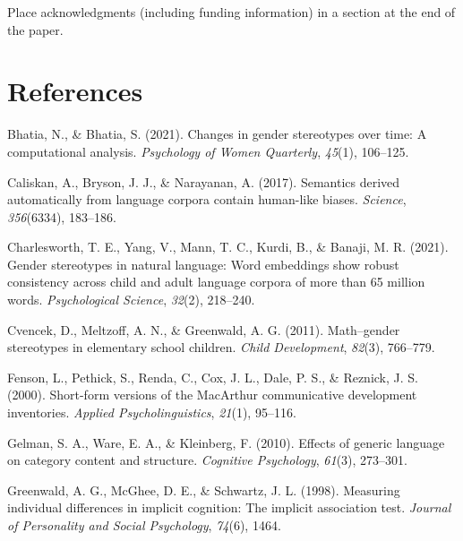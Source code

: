 \documentclass[10pt, letterpaper]{article}
\newenvironment{CSLReferences}%
  {}%
  {\par}
\begin{document}
Place acknowledgments (including funding information) in a section at
the end of the paper.

\hypertarget{references}{%
\section{References}\label{references}}

\setlength{\parindent}{-0.1in} 
\setlength{\leftskip}{0.125in}

\noindent

\hypertarget{refs}{}
\begin{CSLReferences}{1}{0}
\leavevmode{}%
Bhatia, N., \& Bhatia, S. (2021). Changes in gender stereotypes over
time: A computational analysis. \emph{Psychology of Women Quarterly},
\emph{45}(1), 106--125.

\leavevmode{}%
Caliskan, A., Bryson, J. J., \& Narayanan, A. (2017). Semantics derived
automatically from language corpora contain human-like biases.
\emph{Science}, \emph{356}(6334), 183--186.

\leavevmode{}%
Charlesworth, T. E., Yang, V., Mann, T. C., Kurdi, B., \& Banaji, M. R.
(2021). Gender stereotypes in natural language: Word embeddings show
robust consistency across child and adult language corpora of more than
65 million words. \emph{Psychological Science}, \emph{32}(2), 218--240.

\leavevmode{}%
Cvencek, D., Meltzoff, A. N., \& Greenwald, A. G. (2011). Math--gender
stereotypes in elementary school children. \emph{Child Development},
\emph{82}(3), 766--779.

\leavevmode{}%
Fenson, L., Pethick, S., Renda, C., Cox, J. L., Dale, P. S., \& Reznick,
J. S. (2000). Short-form versions of the MacArthur communicative
development inventories. \emph{Applied Psycholinguistics}, \emph{21}(1),
95--116.

\leavevmode{}%
Gelman, S. A., Ware, E. A., \& Kleinberg, F. (2010). Effects of generic
language on category content and structure. \emph{Cognitive Psychology},
\emph{61}(3), 273--301.

\leavevmode{}%
Greenwald, A. G., McGhee, D. E., \& Schwartz, J. L. (1998). Measuring
individual differences in implicit cognition: The implicit association
test. \emph{Journal of Personality and Social Psychology}, \emph{74}(6),
1464.


\end{CSLReferences}
\end{document}
